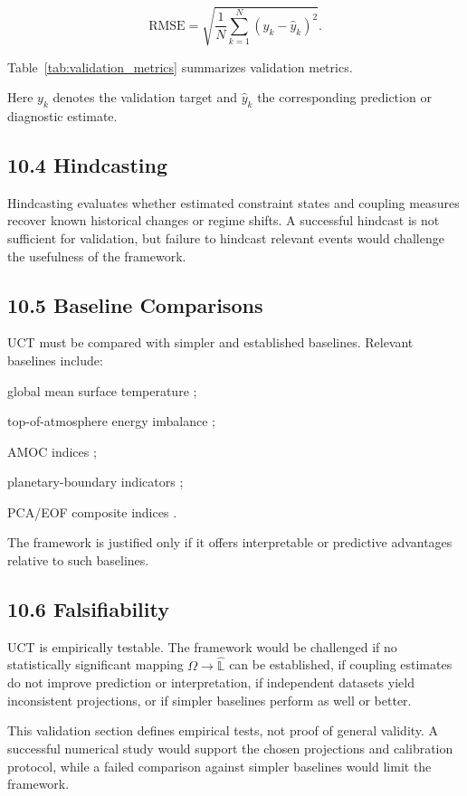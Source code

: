 \[ \mathrm{RMSE}=\sqrt{\frac{1}{N}\sum_{k=1}^N (y_k-\hat{y}_k)^2}. \]

Table~\ref{tab:validation_metrics} summarizes validation metrics.



Here \(y_k\) denotes the validation target and \(\hat{y}_k\) the corresponding prediction or diagnostic estimate.

\subsection{10.4 Hindcasting}

Hindcasting evaluates whether estimated constraint states and coupling measures recover known historical changes or regime shifts. A successful hindcast is not sufficient for validation, but failure to hindcast relevant events would challenge the usefulness of the framework.

\subsection{10.5 Baseline Comparisons}

UCT must be compared with simpler and established baselines. Relevant baselines include:

global mean surface temperature \cite{IPCCAR6WG1};

top-of-atmosphere energy imbalance \cite{LoebCERES};

AMOC indices \cite{IPCCAR6WG1,RoemmichArgo};

planetary-boundary indicators \cite{Rockstrom2009,Steffen2015,Richardson2023};

PCA/EOF composite indices \cite{Jolliffe2002PCA,Preisendorfer1988EOF}.

The framework is justified only if it offers interpretable or predictive advantages relative to such baselines.

\subsection{10.6 Falsifiability}

UCT is empirically testable. The framework would be challenged if no statistically significant mapping \(\Omega\rightarrow\hat{\mathbb{L}}\) can be established, if coupling estimates do not improve prediction or interpretation, if independent datasets yield inconsistent projections, or if simpler baselines perform as well or better.

This validation section defines empirical tests, not proof of general validity. A successful numerical study would support the chosen projections and calibration protocol, while a failed comparison against simpler baselines would limit the framework.


